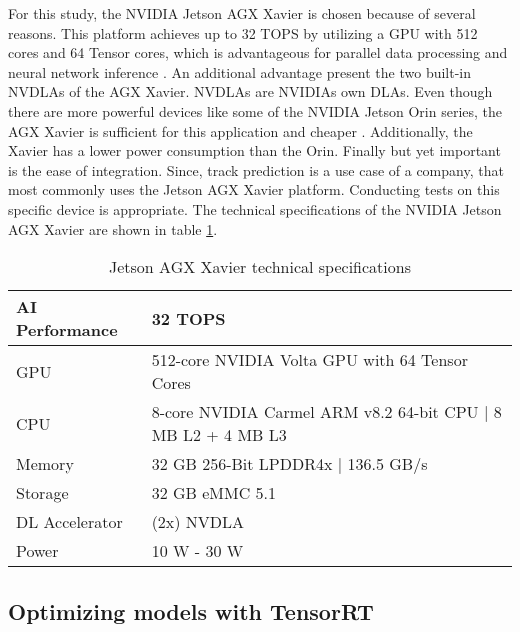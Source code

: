 For this study, the NVIDIA Jetson AGX Xavier is chosen because of several reasons.
This platform achieves up to 32 TOPS by utilizing a \ac{GPU} with 512 cores and 64 Tensor cores, which is advantageous for parallel data processing and neural network inference \cite{nvidia_jetson_agx_xavier_datasheet}.
An additional advantage present the two built-in \ac{NVDLA}s of the AGX Xavier.
\ac{NVDLA}s are NVIDIAs own \ac{DLA}s.
Even though there are more powerful devices like some of the NVIDIA Jetson Orin series, the AGX Xavier is sufficient for this application and cheaper \cite{nvidia_jetson_embedded_devices_prices}.
Additionally, the Xavier has a lower power consumption than the Orin.
Finally but yet important is the ease of integration.
Since, track prediction is a use case of a company, that most commonly uses the Jetson AGX Xavier platform.
Conducting tests on this specific device is appropriate.
The technical specifications of the NVIDIA Jetson AGX Xavier are shown in table \ref{tab:jetson_AGX_xavier_specs}.

\begin{table}[H]
    \centering
    \begin{tabular}{|l|l|}
        \hline
        AI Performance & 32 TOPS\\
        \hline
        \ac{GPU} & 512-core NVIDIA Volta GPU with 64 Tensor Cores\\
        \hline
        \ac{CPU} & 8-core NVIDIA Carmel ARM v8.2 64-bit CPU | 8 MB L2 + 4 MB L3\\
        \hline
        Memory & 32 GB 256-Bit LPDDR4x | 136.5 GB/s\\
        \hline
        Storage & 32 GB eMMC 5.1\\
        \hline
        DL Accelerator & (2x) NVDLA\\
        \hline
        Power & 10 W - 30 W\\
        \hline
    \end{tabular}
    \caption{Jetson AGX Xavier technical specifications \cite{nvidia_jetson_agx_xavier_datasheet}}
    \label{tab:jetson_AGX_xavier_specs}
\end{table}

\subsection{Optimizing models with TensorRT}

